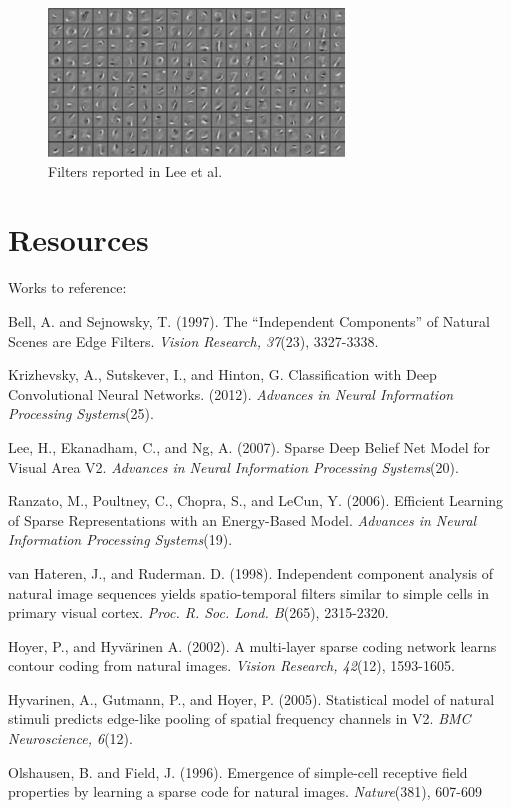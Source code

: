 \documentclass[12pt]{article}
\begin{document}
\begin{figure}[h!]
  \centering
  \includegraphics[width=0.7\textwidth]{lee_mnist_filters.png}
  \caption{Filters reported in Lee et al.}
  \label{lee}
\end{figure}

\section*{Resources}
Works to reference:
\\
\singlespace
\leftskip 0.5in
\parindent -0.5in


Bell, A. and Sejnowsky, T. (1997). The ``Independent Components'' of Natural Scenes are Edge Filters. \emph{Vision Research, 37}(23), 3327-3338.

Krizhevsky, A., Sutskever, I., and Hinton, G. Classification with Deep Convolutional Neural Networks. (2012). \emph{Advances in Neural Information Processing Systems}(25).

Lee, H., Ekanadham, C., and Ng, A. (2007). Sparse Deep Belief Net Model for Visual Area V2. \emph{Advances in Neural Information Processing Systems}(20).

Ranzato, M., Poultney, C., Chopra, S., and LeCun, Y. (2006). Efficient Learning of Sparse Representations with an Energy-Based Model. \emph{Advances in Neural Information Processing Systems}(19).

van Hateren, J., and Ruderman. D. (1998). Independent component analysis of natural image sequences yields spatio-temporal filters similar to simple cells in primary visual cortex. \emph{Proc. R. Soc. Lond. B}(265), 2315-2320.

Hoyer, P., and Hyvärinen A. (2002). A multi-layer sparse coding network
learns contour coding from natural images. \emph{Vision Research, 42}(12), 1593-1605.

Hyvarinen, A., Gutmann, P., and Hoyer, P. (2005). Statistical model of natural stimuli predicts edge-like pooling of spatial frequency channels in V2. \emph{BMC Neuroscience, 6}(12).

Olshausen, B. and Field, J. (1996). Emergence of simple-cell receptive field properties by learning a sparse code for natural images. \emph{Nature}(381), 607-609
\end{document}
